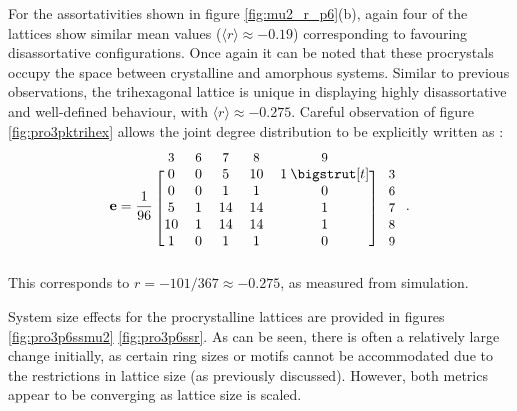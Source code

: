 For the assortativities shown in figure \ref{fig:mu2_r_p6}(b), again four of the lattices show similar mean values ($\langle r \rangle\approx -0.19$) corresponding to favouring disassortative configurations. 
Once again it can be noted that these procrystals occupy the space between crystalline and amorphous systems.
Similar to previous observations, the trihexagonal lattice is unique in displaying highly disassortative and well\--defined behaviour, with $\langle r \rangle \approx -0.275$.
Careful observation of figure \ref{fig:pro3pktrihex} allows the joint degree distribution to be explicitly written as :
\begin{equation}
	\mathbf{e} = \frac{1}{96}\: \begin{blockarray}{*{5}{c} l}
	\begin{block}{*{5}{>{$\footnotesize}c<{$}} l}
	3 & 6 & 7 & 8 & 9 \\
	\end{block}
	\begin{block}{[*{5}{c}]>{$\footnotesize}l<{$}}
	0 & 0 & 5 & 10 & 1\: \bigstrut[t]& \:3\\
	0 & 0 & 1 & 1 & 0 & \:6 \\
	5 & 1 & 14 & 14 & 1 & \:7\\
	10 & 1 & 14 & 14 & 1 & \:8\\
	1 & 0 & 1 & 1 & 0 & \:9\\
	\end{block}
	\end{blockarray}\,.
\end{equation} 
This corresponds to $r=-101/367\approx -0.275$, as measured from simulation.

System size effects for the procrystalline lattices are provided in figures \ref{fig:pro3p6ssmu2} \ref{fig:pro3p6ssr}.
As can be seen, there is often a relatively large change initially, as certain ring sizes or motifs cannot be accommodated due to the restrictions in lattice size (as previously discussed).
However, both metrics appear to be converging as lattice size is scaled.
